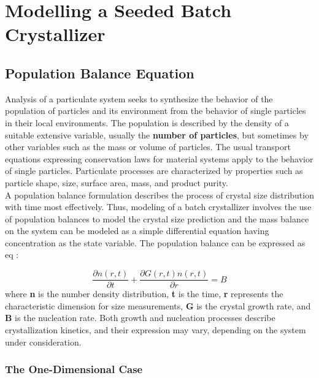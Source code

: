
\chapter{Modelling a Seeded Batch Crystallizer}


\section{Population Balance Equation}

Analysis of a particulate system seeks to synthesize the behavior of the population of particles and its environment from the behavior of single particles in their local environments. The population is described by the density of a suitable extensive variable, usually the \textbf{number of particles}, but sometimes by other variables such as the mass or volume of particles. The usual transport equations expressing conservation laws for material systems apply to the behavior of single particles. Particulate processes are characterized by properties such as particle shape, size, surface area, mass, and product purity. \\
A population balance formulation describes the process of crystal size distribution with time most effectively. Thus, modeling of a batch crystallizer involves the use of population balances to model the crystal size prediction and the mass balance on the system can be modeled as a simple differential equation having concentration as the state variable.
The population balance can be expressed as eq :

\begin{equation}
	\frac{\partial{n(r,t)}}{\partial{t}} + \frac{\partial{G(r,t)n(r,t)}}{\partial{r}} = B

\end{equation}
where \textbf{n} is the number density distribution, \textbf{t} is the time, \textbf{r} represents the characteristic dimension for size measurements, \textbf{G} is the crystal growth rate, and \textbf{B} is the nucleation rate. Both growth and nucleation processes describe crystallization kinetics, and their expression may vary, depending on the system under consideration.

\subsection{The One-Dimensional Case}


